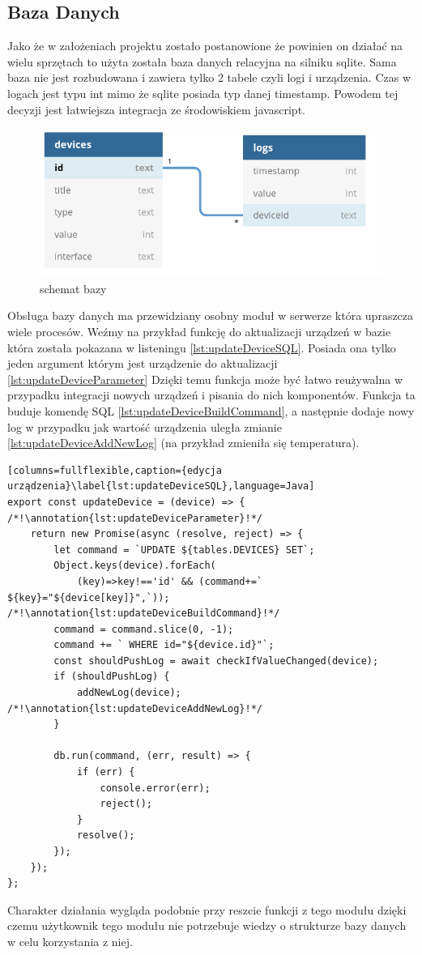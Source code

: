 \subsection{Baza Danych}
Jako że w założeniach projektu zostało postanowione że powinien on działać na wielu sprzętach to użyta została baza danych relacyjna na silniku sqlite. Sama baza nie jest rozbudowana i zawiera tylko 2 tabele czyli logi i urządzenia. Czas w logach jest typu int mimo że sqlite posiada typ danej timestamp. Powodem tej decyzji jest łatwiejsza integracja ze środowiskiem javascript. 
\begin{figure}[h!]
  \includegraphics[width=\linewidth]{db.png}
  \caption{schemat bazy}
  \label{fig:db}
\end{figure}

Obsługa bazy danych ma przewidziany osobny moduł w serwerze która upraszcza wiele procesów. Weźmy na przykład funkcję do aktualizacji urządzeń w bazie która została pokazana w listeningu \ref{lst:updateDeviceSQL}. Posiada ona tylko jeden argument którym jest urządzenie do aktualizacji \ref{lst:updateDeviceParameter} Dzięki temu funkcja może być łatwo reużywalna w przypadku integracji nowych urządzeń i pisania do nich komponentów. Funkcja ta buduje komendę SQL \ref{lst:updateDeviceBuildCommand}, a następnie dodaje nowy log w przypadku jak wartość urządzenia uległa zmianie \ref{lst:updateDeviceAddNewLog} (na przykład zmieniła się temperatura).
\newpage
\begin{lstlisting}[columns=fullflexible,caption={edycja urządzenia}\label{lst:updateDeviceSQL},language=Java]
export const updateDevice = (device) => { /*!\annotation{lst:updateDeviceParameter}!*/
	return new Promise(async (resolve, reject) => {
		let command = `UPDATE ${tables.DEVICES} SET`;
		Object.keys(device).forEach(
		    (key)=>key!=='id' && (command+=` ${key}="${device[key]}",`)); /*!\annotation{lst:updateDeviceBuildCommand}!*/
		command = command.slice(0, -1);
		command += ` WHERE id="${device.id}"`;
		const shouldPushLog = await checkIfValueChanged(device);
		if (shouldPushLog) {
			addNewLog(device); /*!\annotation{lst:updateDeviceAddNewLog}!*/
		}

		db.run(command, (err, result) => {
			if (err) {
				console.error(err);
				reject();
			}
			resolve();
		});
	});
};
\end{lstlisting}
Charakter działania wygląda podobnie przy reszcie funkcji z tego modułu dzięki czemu użytkownik tego modułu nie potrzebuje wiedzy o strukturze bazy danych w celu korzystania z niej. 

